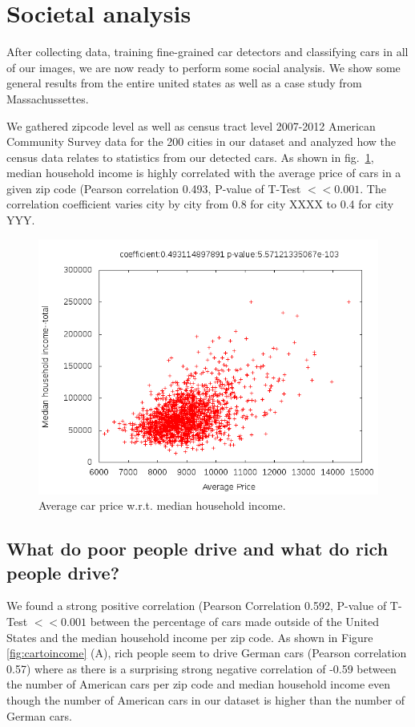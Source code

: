 \documentclass[10pt,twocolumn,letterpaper]{article}
\begin{document}
\section{Societal analysis}
\label{sec:social}
After collecting data, training fine-grained car detectors and classifying cars in all of our images, we are now ready to perform some social analysis. We show some general results from the entire united states as well as a case study from Massachussettes.

We gathered zipcode level as well as census tract level 2007-2012 American Community Survey data for the 200 cities in our dataset and analyzed how the census data relates to statistics from our detected cars. As shown in fig.~\ref{fig:corrs}, median household income is highly correlated with the average price of cars in a given zip code (Pearson correlation 0.493, P-value of T-Test \(<< 0.001\). The correlation coefficient varies city by city from 0.8 for city XXXX to 0.4 for city YYY. 

\begin{figure}[t]
\begin{center}
   \includegraphics[width=0.8\linewidth]{img/averagePriceIncome.png}
\end{center}
   \caption {Average car price w.r.t. median household income.}
\label{fig:corrs}
\end{figure}

\subsection{What do poor people drive and what do rich people drive?}
We found a strong positive correlation (Pearson Correlation 0.592, P-value of T-Test \(<< 0.001\) between the percentage of cars made outside of the United States and the median household income per zip code. As shown in Figure \ref{fig:cartoincome} (A), rich people seem to drive German cars (Pearson correlation 0.57) where as there is a surprising strong negative correlation of -0.59 between the number of American cars per zip code and median household income even though the number of American cars in our dataset is higher than the number of German cars. 
\end{document}
